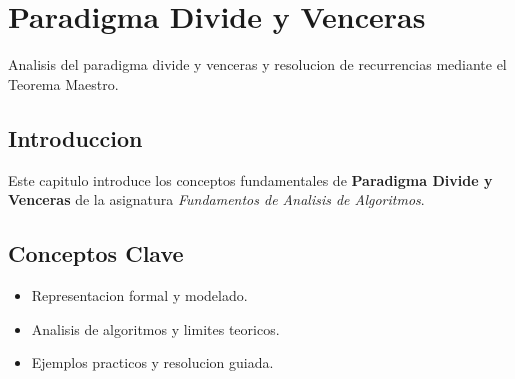 \chapter{Paradigma Divide y Venceras}
\label{ch:divide_venceras}

Analisis del paradigma divide y venceras y resolucion de recurrencias mediante el Teorema Maestro.

\section{Introduccion}
Este capitulo introduce los conceptos fundamentales de \textbf{Paradigma Divide y Venceras} de la asignatura \textit{Fundamentos de Analisis de Algoritmos}.

\section{Conceptos Clave}
\begin{itemize}
    \item Representacion formal y modelado.
    \item Analisis de algoritmos y limites teoricos.
    \item Ejemplos practicos y resolucion guiada.
\end{itemize}
